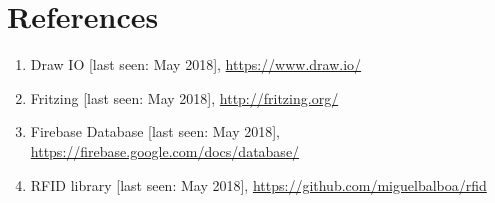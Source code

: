 \documentclass[a4paper,11pt]{article}
\begin{document}
\newpage
\section{References}
\begin{enumerate}
\item Draw IO [last seen: May 2018], \url{https://www.draw.io/}
\item Fritzing [last seen: May 2018], \url{http://fritzing.org/}
\item Firebase Database [last seen: May 2018], \url{https://firebase.google.com/docs/database/}
\item RFID library [last seen: May 2018], \url{https://github.com/miguelbalboa/rfid}
\end{enumerate}
\end{document}
